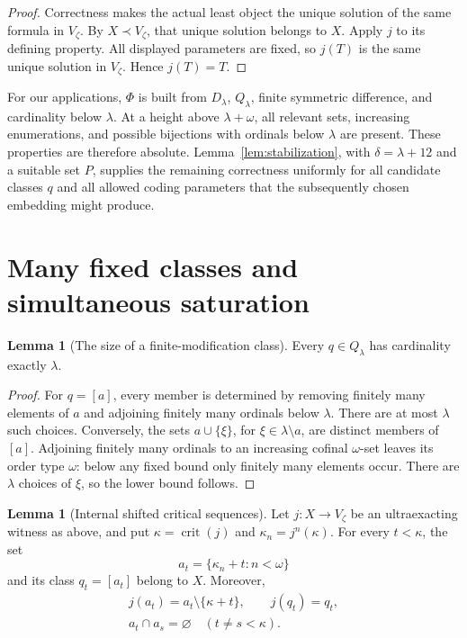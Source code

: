 \documentclass[11pt,letterpaper]{article}
\theoremstyle{definition}
\newtheorem{lemma}[definition]{Lemma}
\newcommand{\crit}{\operatorname{crit}}
\numberwithin{equation}{section}
\begin{document}
\begin{proof}
Correctness makes the actual least object the unique solution of the same
formula in $V_\zeta$. By $X\prec V_\zeta$, that unique solution belongs to
$X$. Apply $j$ to its defining property. All displayed parameters are fixed,
so $j(T)$ is the same unique solution in $V_\zeta$. Hence $j(T)=T$.
\end{proof}

For our applications, $\Phi$ is built from $D_\lambda$, $Q_\lambda$, finite
symmetric difference, and cardinality below $\lambda$. At a height above
$\lambda+\omega$, all relevant sets, increasing enumerations, and possible
bijections with ordinals below $\lambda$ are present. These properties are
therefore absolute. Lemma~\ref{lem:stabilization}, with $\delta=\lambda+12$ and a suitable
set $P$, supplies the remaining correctness uniformly for all candidate
classes $q$ and all allowed coding parameters that the subsequently chosen
embedding might produce.

\section{Many fixed classes and simultaneous saturation}\label{sec:saturation}

\begin{lemma}[The size of a finite-modification class]\label{lem:class-size}
Every $q\in Q_\lambda$ has cardinality exactly $\lambda$.
\end{lemma}

\begin{proof}
For $q=[a]$, every member is determined by removing finitely many elements
of $a$ and adjoining finitely many ordinals below $\lambda$. There are at
most $\lambda$ such choices. Conversely, the sets $a\cup\{\xi\}$, for
$\xi\in\lambda\setminus a$, are distinct members of $[a]$. Adjoining finitely
many ordinals to an increasing cofinal $\omega$-set leaves its order type
$\omega$: below any fixed bound only finitely many elements occur. There are
$\lambda$ choices of $\xi$, so the lower bound follows.
\end{proof}

\begin{lemma}[Internal shifted critical sequences]\label{lem:shifted}
Let $j:X\to V_\zeta$ be an ultraexacting witness as above, and put
$\kappa=\crit(j)$ and $\kappa_n=j^n(\kappa)$. For every $t<\kappa$, the set
\[
       a_t=\{\kappa_n+t:n<\omega\}
\]
and its class $q_t=[a_t]$ belong to $X$. Moreover,
\[
 \begin{gathered}
 j(a_t)=a_t\setminus\{\kappa+t\},\qquad j(q_t)=q_t,\\
 a_t\cap a_s=\varnothing\quad(t\ne s<\kappa).
\end{gathered}
\]
\end{lemma}
\end{document}
